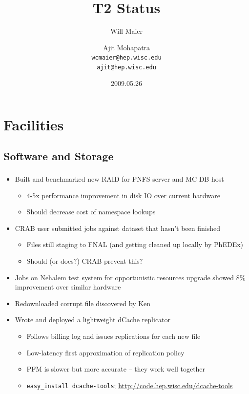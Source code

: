 \documentclass{beamer}
\title{T2 Status}
\author[Maier, Mohapatra]{
    Will Maier \and Ajit Mohapatra\\ 
    {\tt wcmaier@hep.wisc.edu}\\
    {\tt ajit@hep.wisc.edu}}
\institute[Wisconsin]{University of Wisconsin - High Energy Physics}
\date{2009.05.26}
\begin{document}
\begin{frame}
    \titlepage
\end{frame}


\section{Facilities}
\subsection{Software and Storage}
\begin{frame}
\frametitle{}
\begin{itemize}
	\item Built and benchmarked new RAID for PNFS server and MC DB host
	\begin{itemize}
		\item 4-5x performance improvement in disk IO over current hardware
		\item Should decrease cost of namespace lookups
	\end{itemize}
	\item CRAB user submitted jobs against dataset that hasn't been finished
	\begin{itemize}
		\item Files still staging to FNAL (and getting cleaned up locally by PhEDEx)
		\item Should (or does?) CRAB prevent this?
	\end{itemize}
	\item Jobs on Nehalem test system for opportunistic resources upgrade showed 8\% improvement over similar hardware
	\item Redownloaded corrupt file discovered by Ken
	\item Wrote and deployed a lightweight dCache replicator
	\begin{itemize}
		\item Follows billing log and issues replications for each new file
		\item Low-latency first approximation of replication policy
		\item PFM is slower but more accurate -- they work well together
		\item {\tt easy\_install dcache-tools}; \url{http://code.hep.wisc.edu/dcache-tools}
	\end{itemize}
\end{itemize}
\end{frame}
\end{document}
